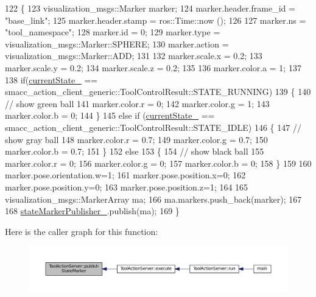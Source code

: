 \begin{DoxyCode}
122 \{
123     visualization\_msgs::Marker marker;
124     marker.header.frame\_id = \textcolor{stringliteral}{"base\_link"};
125     marker.header.stamp = ros::Time::now ();
126 
127     marker.ns = \textcolor{stringliteral}{"tool\_namespace"};
128     marker.id = 0;
129     marker.type = visualization\_msgs::Marker::SPHERE;
130     marker.action = visualization\_msgs::Marker::ADD;
131     
132     marker.scale.x = 0.2;
133     marker.scale.y = 0.2;
134     marker.scale.z = 0.2;
135 
136     marker.color.a = 1;
137 
138     \textcolor{keywordflow}{if}(\hyperlink{classToolActionServer_aac4862d8c313b07e8506eb0c74507fb1}{currentState\_} == smacc\_action\_client\_generic::ToolControlResult::STATE\_RUNNING)
139     \{
140       \textcolor{comment}{// show green ball}
141       marker.color.r = 0;
142       marker.color.g = 1;
143       marker.color.b = 0;
144     \}
145     \textcolor{keywordflow}{else} \textcolor{keywordflow}{if} (\hyperlink{classToolActionServer_aac4862d8c313b07e8506eb0c74507fb1}{currentState\_} == smacc\_action\_client\_generic::ToolControlResult::STATE\_IDLE)
146     \{
147       \textcolor{comment}{// show gray ball}
148       marker.color.r = 0.7;
149       marker.color.g = 0.7;
150       marker.color.b = 0.7;
151     \}
152     \textcolor{keywordflow}{else}
153     \{
154       \textcolor{comment}{// show black ball}
155       marker.color.r = 0;
156       marker.color.g = 0;
157       marker.color.b = 0;
158     \}
159 
160     marker.pose.orientation.w=1;
161     marker.pose.position.x=0;
162     marker.pose.position.y=0;
163     marker.pose.position.z=1;
164 
165     visualization\_msgs::MarkerArray ma;
166     ma.markers.push\_back(marker);
167 
168     \hyperlink{classToolActionServer_a1b3cb5d19e61b0207ef3f8fd99fc196d}{stateMarkerPublisher\_}.publish(ma);
169 \}
\end{DoxyCode}


Here is the caller graph for this function\+:
\nopagebreak
\begin{figure}[H]
\begin{center}
\leavevmode
\includegraphics[width=350pt]{classToolActionServer_aef01c70e358c933855db3a37b46a3740_icgraph}
\end{center}
\end{figure}



